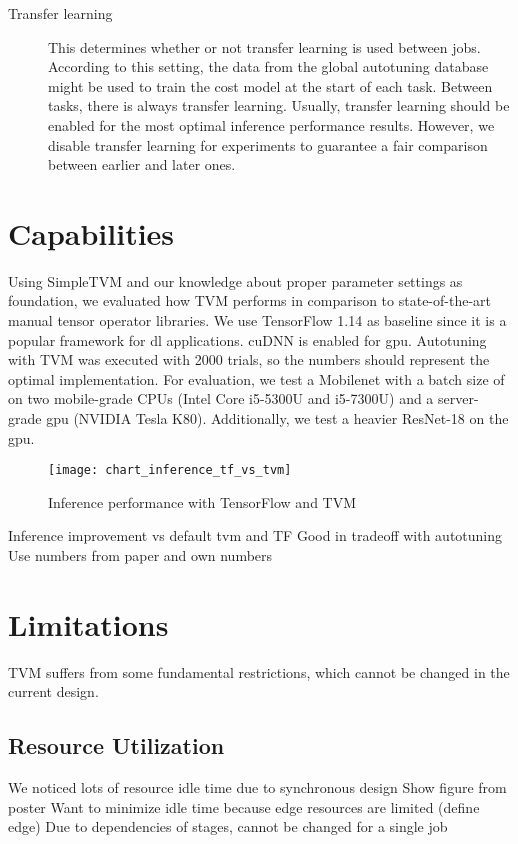 \begin{description}
	\item[Transfer learning] This determines whether or not transfer learning is used between jobs. According to this setting, the data from the global autotuning database might be used to train the cost model at the start of each task. Between tasks, there is always transfer learning. Usually, transfer learning should be enabled for the most optimal inference performance results. However, we disable transfer learning for experiments to guarantee a fair comparison between earlier and later ones.
\end{description}


\section{Capabilities}
Using SimpleTVM and our knowledge about proper parameter settings as foundation, we evaluated how TVM performs in comparison to state-of-the-art manual tensor operator libraries. We use TensorFlow 1.14 as baseline since it is a popular framework for \gls{dl} applications. cuDNN is enabled for \gls{gpu}. Autotuning with TVM was executed with 2000 trials, so the numbers should represent the optimal implementation. For evaluation, we test a Mobilenet with a batch size of on two mobile-grade CPUs (Intel Core i5-5300U and i5-7300U) and a server-grade \gls{gpu} (NVIDIA Tesla K80). Additionally, we test a heavier ResNet-18 on the \gls{gpu}.

\begin{figure}
	\centering
	\texttt{[image: chart\_inference\_tf\_vs\_tvm]}%
	\caption{Inference performance with TensorFlow and TVM}
	\label{fig:inf-tf-tvm}
\end{figure}

Inference improvement vs default tvm and TF
Good in tradeoff with autotuning
Use numbers from paper and own numbers

\section{Limitations}
TVM suffers from some fundamental restrictions, which cannot be changed in the current design.

\subsection{Resource Utilization}
We noticed lots of resource idle time due to synchronous design
Show figure from poster
Want to minimize idle time because edge resources are limited (define edge)
Due to dependencies of stages, cannot be changed for a single job

